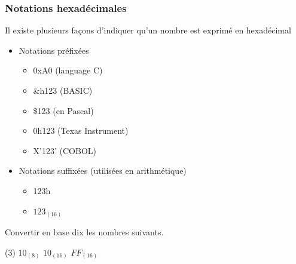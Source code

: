 \documentclass[a4paper,11pt]{book}
\theoremstyle{definition}
\begin{document}
\subsubsection{Notations hexadécimales}
Il existe plusieurs façons d'indiquer qu'un nombre est exprimé en hexadécimal
\begin{itemize}
    \item Notations préfixées
    \begin{itemize}
        \item 0xA0 (language C)
        \item \&h123 (BASIC)
        \item \$123 (en Pascal)
        \item 0h123 (Texas Instrument)
        \item X'123' (COBOL)
    \end{itemize}
    \item Notations suffixées (utilisées en arithmétique)
    \begin{itemize}
        \item 123h
        \item $123_{(16)}$
    \end{itemize}
\end{itemize}

\begin{exercise}
    Convertir en base dix les nombres suivants.
    \begin{tasks}(3)
        \task $10_{(8)}$
        \task $10_{(16)}$
        \task $FF_{(16)}$
    \end{tasks}
\end{exercise}
\end{document}
